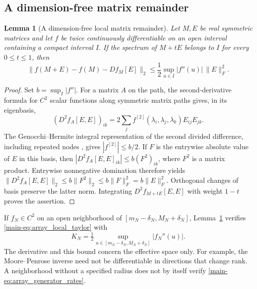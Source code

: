 \documentclass[11pt,a4paper,leqno]{article}
\numberwithin{equation}{section}
\numberwithin{figure}{section}
\numberwithin{table}{section}
\theoremstyle{plain}
\newtheorem{lemma}{Lemma}[section]
\theoremstyle{definition}
\theoremstyle{remark}
\begin{document}
\subsection{A dimension-free matrix remainder}
\label{supp:matrix-curvature}
\begin{lemma}[A dimension-free local matrix remainder]
\label{lem:matrix_curvature}
Let \(M,E\) be real symmetric matrices and let \(f\) be twice continuously
differentiable on an open interval containing a compact interval \(I\).
If the spectrum of \(M+tE\) belongs to \(I\) for every \(0\le t\le1\),
then
\[
 \|f(M+E)-f(M)-Df_M[E]\|_2
 \le \frac12\sup_{u\in I}|f''(u)|\,\|E\|_F^2.
\]
\end{lemma}
\begin{proof}
Set \(b=\sup_I|f''|\). For a matrix \(A\) on the path, the
second-derivative formula for \(C^2\) scalar functions along symmetric matrix paths
\citep[Theorems~6--7]{bickel2013differentiating} gives, in its eigenbasis,
\[
 (D^2f_A[E,E])_{ik}
 =2\sum_j f^{[2]}(\lambda_i,\lambda_j,\lambda_k)E_{ij}E_{jk}.
\]
The Genocchi--Hermite integral representation of the second divided difference,
including repeated nodes \citep[Eq.~(52)]{deboor2005divided}, gives
\(|f^{[2]}|\le b/2\). If \(F\) is the entrywise
absolute value of \(E\) in this basis, then
\(|D^2f_A[E,E]_{ik}|\le b(F^2)_{ik}\), where \(F^2\) is a matrix product.
Entrywise nonnegative domination therefore yields
\(\|D^2f_A[E,E]\|_2\le b\|F^2\|_2
 \le b\|F\|_F^2=b\|E\|_F^2\).
Orthogonal changes of basis preserve the latter norm.
Integrating \(D^2f_{M+tE}[E,E]\) with weight \(1-t\) proves the assertion.
\end{proof}

If \(f_N\in C^2\) on an open neighborhood of
\([m_N-\delta_N,M_N+\delta_N]\), Lemma~\ref{lem:matrix_curvature}
verifies \eqref{main-eq:array_local_taylor} with
\[
 K_N=\tfrac12\sup_{u\in[m_N-\delta_N,M_N+\delta_N]}|f_N''(u)|.
\]
The derivative and this bound concern the effective space only.
For example, the Moore--Penrose inverse need not be differentiable in
directions that change rank. A neighborhood without a specified radius
does not by itself verify \eqref{main-eq:array_generator_rates}.
\end{document}
